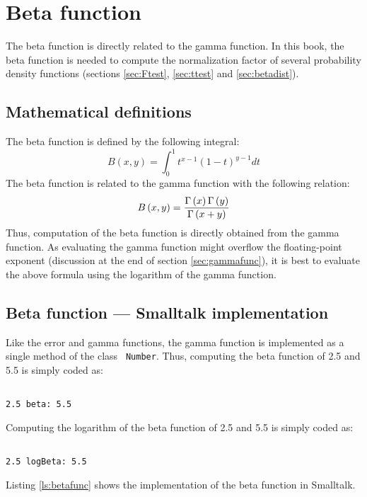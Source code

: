 \documentclass[twoside]{book}
\begin{document}
\section{Beta function}
\label{sec:betafunc} The beta function is directly related to the
gamma function. In this book, the beta function is needed to
compute the normalization factor of several probability density
functions (\cf sections \ref{sec:Ftest}, \ref{sec:ttest} and
\ref{sec:betadist}).
\subsection{Mathematical definitions}
The beta function is defined by the following integral:
\begin{equation}
\label{eq:betaint} B\left(x,y\right)=\int_0^1
t^{x-1}\left(1-t\right)^{y-1}dt
\end{equation}
The beta function is related to the gamma function with the
following relation:
\begin{equation}
B\left(x,y\right)={\Gamma\left(x\right)\Gamma\left(y\right)\over\Gamma\left(x+y\right)}
\end{equation}
Thus, computation of the beta function is directly obtained from
the gamma function. As evaluating the gamma function might
overflow the floating-point exponent (\cf discussion at the end of
section \ref{sec:gammafunc}), it is best to evaluate the above
formula using the logarithm of the gamma function.

\subsection{Beta function --- Smalltalk implementation}
 Like the error and gamma functions, the
gamma function is implemented as a single method of the class {\tt
Number}. Thus, computing the beta function of 2.5 and 5.5 is
simply coded as:
\begin{codeExample}
\begin{verbatim}

2.5 beta: 5.5
\end{verbatim}
\end{codeExample} Computing the logarithm of the beta function of
2.5 and 5.5 is simply coded as:
\begin{codeExample}
\begin{verbatim}

2.5 logBeta: 5.5
\end{verbatim}
\end{codeExample}
Listing \ref{ls:betafunc} shows the
implementation of the beta function in Smalltalk.
\begin{listing}
\label{ls:betafunc}

\end{listing}
\end{document}
